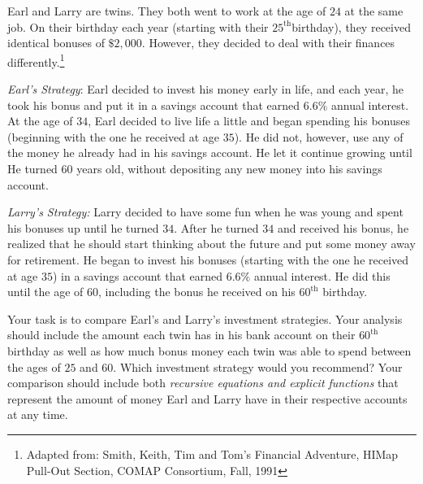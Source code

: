 \documentclass[10pt,]{book}
\theoremstyle{ptxdefinitionnotitle}
\theoremstyle{ptxdefinitiontitle}
\theoremstyle{ptxdefinitionnotitle}
\theoremstyle{ptxdefinitiontitle}
\theoremstyle{ptxdefinitionnotitle}
\theoremstyle{ptxdefinitiontitle}
\numberwithin{equation}{section}
\begin{document}
\begin{divisionexercise}{15}\hypertarget{exercise-46}{}
\hypertarget{p-189}{}%
Earl and Larry are twins.  They both went to work at the age of \(24\) at the same job.  On their birthday each year (starting with their \(25^{\text{th}}\)birthday), they received identical bonuses of \(\$2,000\).  However, they decided to deal with their finances differently.\footnote{Adapted from: Smith, Keith, Tim and Tom's Financial Adventure, HIMap Pull-Out Section, COMAP Consortium, Fall, 1991\label{fn-3}}%
\par
\hypertarget{p-190}{}%
%
\par
\hypertarget{p-191}{}%
\emph{Earl's Strategy}: Earl decided to invest his money early in life, and each year, he took his bonus and put it in a savings account that earned \(6.6\%\) annual interest.  At the age of \(34\), Earl decided to live life a little and began spending his bonuses (beginning with the one he received at age \(35\)).  He did not, however, use any of the money he already had in his savings account.  He let it continue growing until He turned \(60\) years old, without depositing any new money into his savings account.%
\par
\hypertarget{p-192}{}%
%
\par
\hypertarget{p-193}{}%
\emph{Larry's Strategy:} Larry decided to have some fun when he was young and spent his bonuses up until he turned \(34\).  After he turned \(34\) and received his bonus, he realized that he should start thinking about the future and put some money away for retirement.  He began to invest his bonuses (starting with the one he received at age \(35\)) in a savings account that earned \(6.6\%\) annual interest.  He did this until the age of \(60\), including the bonus he received on his \(60^{\text{th}}\) birthday.%
\par
\hypertarget{p-194}{}%
%
\par
\hypertarget{p-195}{}%
Your task is to compare Earl's and Larry's investment strategies.  Your analysis should include the amount each twin has in his bank account on their \(60^{\text{th}}\) birthday as well as how much bonus money each twin was able to spend between the ages of \(25\) and \(60\).  Which investment strategy would you recommend?  Your comparison should include both \emph{recursive equations and explicit functions} that represent the amount of money Earl and Larry have in their respective accounts at any time.%
\end{divisionexercise}%
\typeout{************************************************}
\typeout{************************************************}
\end{document}
